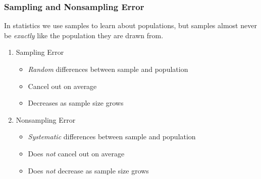 \documentclass[handout]{beamer}
\begin{document}
\begin{frame}
\frametitle{Sampling and Nonsampling Error}
In statistics we use samples to learn about populations, but samples almost never be \emph{exactly} like the population they are drawn from.
	\begin{enumerate}
		\item Sampling Error 
			\begin{itemize}
				\item \emph{Random} differences between sample and population
				\item Cancel out on average
				\item Decreases as sample size grows
			\end{itemize}
		\item Nonsampling Error
			\begin{itemize}
				\item \emph{Systematic} differences between sample and population 
				\item Does \emph{not} cancel out on average
				\item Does \emph{not} decrease as sample size grows
			\end{itemize}
	\end{enumerate}
\end{frame}
\end{document}
